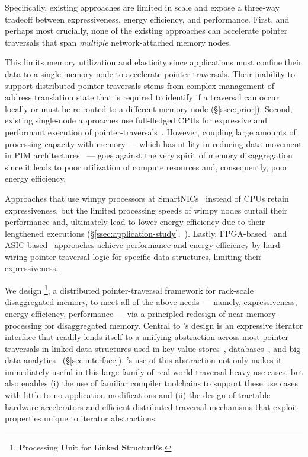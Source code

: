 Specifically, existing approaches are limited in scale and expose a three-way tradeoff between expressiveness, energy efficiency, and performance. First, and perhaps most crucially, none of the existing approaches can accelerate pointer traversals that span \emph{multiple} network-attached memory nodes. 

This limits memory utilization and elasticity since applications must confine their data to a single memory node to accelerate pointer traversals. Their inability to support distributed pointer traversals stems from complex management of address translation state that is required to identify if a traversal can occur locally or must be re-routed to a different memory node (\S\ref{ssec:prior}). Second, existing single-node approaches use full-fledged CPUs for expressive and performant execution of pointer-traversals~\cite{storagefunctions, splinter, aifm, kayak_nsdi_21}. However, coupling large amounts of processing capacity with memory --- which has utility in reducing data movement in PIM architectures~\cite{ahn2015scalable, dai2018graphh, schuiki2018scalable, mutlu2019processing, mutlu2022modern, oliveira2022accelerating, eckert2022eidetic, xie2023mpu, tu2022redcim, lockerman2020livia, asghari2016chameleon, devic2022_PIM, wang2022_Nearstream} ---  goes against the very spirit of memory disaggregation since it leads to poor utilization of compute resources and, consequently, poor energy efficiency. 

Approaches that use wimpy processors at SmartNICs~\cite{rmc_hotnets20, redn} instead of CPUs retain expressiveness, but the limited processing speeds of wimpy nodes curtail their performance and, ultimately lead to lower energy efficiency due to their lengthened executions (\S\ref{ssec:application-study},~\cite{clio}). Lastly, FPGA-based~\cite{clio, strom, sun2023demystifying} and ASIC-based~\cite{impica, walkers} approaches achieve performance and energy efficiency by hard-wiring pointer traversal logic for specific data structures, limiting their expressiveness.  


We design \name\footnote{\textbf{P}rocessing \textbf{U}nit for \textbf{L}inked \textbf{S}tructur\textbf{E}s.}, a distributed pointer-traversal framework for rack-scale disaggregated memory, to meet all of the above needs --- namely, expressiveness, energy efficiency, performance --- via a principled redesign of near-memory processing for disaggregated memory. Central to \name's design is an expressive iterator interface that readily lends itself to a unifying abstraction across most pointer traversals in linked data structures used in key-value stores~\cite{redis, memcached}, databases~\cite{wiredtiger, btree1, btree2, trie1, trie3}, and big-data analytics~\cite{powergraph, graphx, graphchi, pagerank} (\S\ref{sec:interface}). \name's use of this abstraction not only makes it immediately useful in this large family of real-world traversal-heavy use cases, but also enables (i) the use of familiar compiler toolchains to support these use cases with little to no application modifications and (ii) the design of tractable hardware accelerators and efficient distributed traversal mechanisms that exploit properties unique to iterator abstractions.


